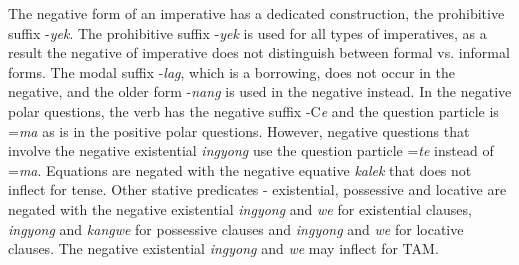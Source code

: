 \documentclass[output=paper,colorlinks,citecolor=brown]{langscibook}
\begin{document}
The negative form of an imperative has a dedicated construction, the prohibitive suffix -\textit{yek}. The prohibitive suffix -\textit{yek} is used for all types of imperatives, as a result the negative of imperative does not distinguish between formal vs. informal forms. The modal suffix -\textit{lag}, which is a borrowing, does not occur in the negative, and the older form -\textit{nang} is used in the negative instead. In the negative polar questions, the verb has the negative suffix -C\textit{e} and the question particle is =\textit{ma} as is in the positive polar questions. However, negative questions that involve the negative existential \textit{ingyong} use the question particle =\textit{te} instead of =\textit{ma}.
\largerpage
Equations are negated with the negative equative \textit{kalek} that does not inflect for tense. Other stative predicates - existential, possessive and locative are negated with the negative existential \textit{ingyong} and \textit{we} for existential clauses, \textit{ingyong} and \textit{kangwe} for possessive clauses and \textit{ingyong} and \textit{we} for locative clauses. The negative existential \textit{ingyong} and \textit{we} may inflect for TAM.
\end{document}
